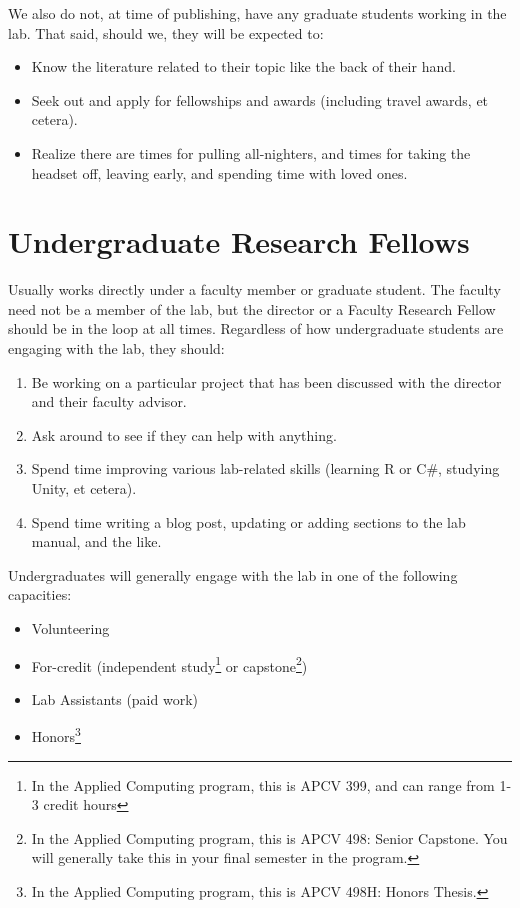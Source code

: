 \documentclass[]{tufte-book}
\providecommand{\tightlist}{%
  \setlength{\itemsep}{0pt}\setlength{\parskip}{0pt}}
\begin{document}
We also do not, at time of publishing, have any graduate students working in the lab. That said, should we, they will be expected to:

\begin{itemize}
\tightlist
\item
  Know the literature related to their topic like the back of their hand.
\item
  Seek out and apply for fellowships and awards (including travel awards, et cetera).
\item
  Realize there are times for pulling all-nighters, and times for taking the headset off, leaving early, and spending time with loved ones.
\end{itemize}

\hypertarget{undergraduate-research-fellows}{%
\section{Undergraduate Research Fellows}\label{undergraduate-research-fellows}}

Usually works directly under a faculty member or graduate student. The faculty need not be a member of the lab, but the director or a Faculty Research Fellow should be in the loop at all times. Regardless of how undergraduate students are engaging with the lab, they should:

\begin{enumerate}
\def\labelenumi{\arabic{enumi}.}
\tightlist
\item
  Be working on a particular project that has been discussed with the director and their faculty advisor.
\item
  Ask around to see if they can help with anything.
\item
  Spend time improving various lab-related skills (learning R or C\#, studying Unity, et cetera).
\item
  Spend time writing a blog post, updating or adding sections to the lab manual, and the like.
\end{enumerate}

Undergraduates will generally engage with the lab in one of the following capacities:

\begin{itemize}
\tightlist
\item
  Volunteering
\item
  For-credit (independent study\footnote{In the Applied Computing program, this is APCV 399, and can range from 1-3 credit hours} or capstone\footnote{In the Applied Computing program, this is APCV 498: Senior Capstone. You will generally take this in your final semester in the program.})
\item
  Lab Assistants (paid work)
\item
  Honors\footnote{In the Applied Computing program, this is APCV 498H: Honors Thesis.}
\end{itemize}
\end{document}
